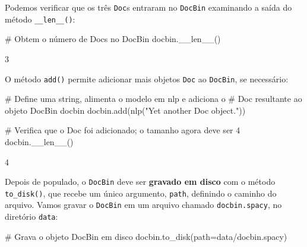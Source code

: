 \documentclass[
  brazilian,
  11pt,
]{article}
\newenvironment{Shaded}{\begin{snugshade}}{\end{snugshade}}
\newcommand{\CommentTok}[1]{\textcolor[rgb]{0.48,0.49,0.49}{#1}}
\newcommand{\FunctionTok}[1]{\textcolor[rgb]{0.56,0.27,0.68}{#1}}
\newcommand{\NormalTok}[1]{\textcolor[rgb]{0.81,0.81,0.76}{#1}}
\newcommand{\OperatorTok}[1]{\textcolor[rgb]{0.81,0.81,0.76}{#1}}
\newcommand{\StringTok}[1]{\textcolor[rgb]{0.96,0.31,0.31}{#1}}
\let\oldtexttt\texttt
\renewcommand{\texttt}[1]{{\color{inlink}\oldtexttt{#1}}}
\begin{document}
Podemos verificar que os três \texttt{Doc}s entraram no \texttt{DocBin}
examinando a saída do método \texttt{\_\_len\_\_()}:

\begin{Shaded}
\begin{Highlighting}[]
\CommentTok{\# Obtem o número de Docs no DocBin}
\NormalTok{docbin.}\FunctionTok{\_\_len\_\_}\NormalTok{()}
\end{Highlighting}
\end{Shaded}

\begin{Shaded}
\begin{Highlighting}[]
\NormalTok{3}
\end{Highlighting}
\end{Shaded}

O método \texttt{add()} permite adicionar mais objetos \texttt{Doc} ao
\texttt{DocBin}, se necessário:

\begin{Shaded}
\begin{Highlighting}[]
\CommentTok{\# Define uma string, alimenta o modelo em \textquotesingle{}nlp\textquotesingle{} e adiciona o}
\CommentTok{\# Doc resultante ao objeto DocBin \textquotesingle{}docbin\textquotesingle{}}
\NormalTok{docbin.add(nlp(}\StringTok{"Yet another Doc object."}\NormalTok{))}

\CommentTok{\# Verifica que o Doc foi adicionado; o tamanho agora deve ser 4}
\NormalTok{docbin.}\FunctionTok{\_\_len\_\_}\NormalTok{()}
\end{Highlighting}
\end{Shaded}

\begin{Shaded}
\begin{Highlighting}[]
\NormalTok{4}
\end{Highlighting}
\end{Shaded}

Depois de populado, o \texttt{DocBin} deve ser \textbf{gravado em disco}
com o método \texttt{to\_disk()}, que recebe um único argumento,
\texttt{path}, definindo o caminho do arquivo. Vamos gravar o
\texttt{DocBin} em um arquivo chamado \texttt{docbin.spacy}, no
diretório \texttt{data}:

\begin{Shaded}
\begin{Highlighting}[]
\CommentTok{\# Grava o objeto DocBin em disco}
\NormalTok{docbin.to\_disk(path}\OperatorTok{=}\StringTok{\textquotesingle{}data/docbin.spacy\textquotesingle{}}\NormalTok{)}
\end{Highlighting}
\end{Shaded}
\end{document}
